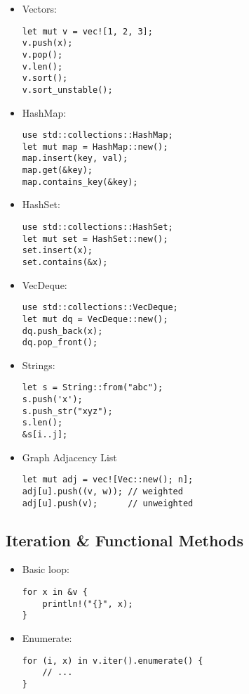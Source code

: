 \documentclass[letterpaper,landscape]{article}
\begin{document}
\begin{multicols*}{3}
\begin{itemize}
\item Vectors:
\begin{verbatim}
let mut v = vec![1, 2, 3];
v.push(x);
v.pop();
v.len();
v.sort();
v.sort_unstable();
\end{verbatim}

\item HashMap:
\begin{verbatim}
use std::collections::HashMap;
let mut map = HashMap::new();
map.insert(key, val);
map.get(&key);
map.contains_key(&key);
\end{verbatim}

\item HashSet:
\begin{verbatim}
use std::collections::HashSet;
let mut set = HashSet::new();
set.insert(x);
set.contains(&x);
\end{verbatim}

\item VecDeque:
\begin{verbatim}
use std::collections::VecDeque;
let mut dq = VecDeque::new();
dq.push_back(x);
dq.pop_front();
\end{verbatim}

\item Strings:
\begin{verbatim}
let s = String::from("abc");
s.push('x');
s.push_str("xyz");
s.len();
&s[i..j];
\end{verbatim}

\item Graph Adjacency List
\begin{verbatim}
let mut adj = vec![Vec::new(); n];
adj[u].push((v, w)); // weighted
adj[u].push(v);      // unweighted
\end{verbatim}
\end{itemize}

\subsection*{Iteration \& Functional Methods}
\begin{itemize}
\item Basic loop:
\begin{verbatim}
for x in &v {
    println!("{}", x);
}
\end{verbatim}

\item Enumerate:
\begin{verbatim}
for (i, x) in v.iter().enumerate() {
    // ...
}
\end{verbatim}


\end{itemize}
\end{multicols*}
\end{document}
